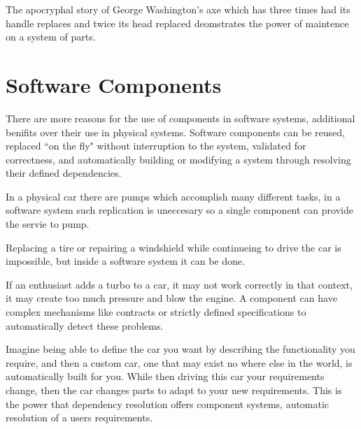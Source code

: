 \documentclass{report}
\begin{document}
The apocryphal story of George Washington's axe which has three times had its handle replaces and twice its head replaced deomstrates the power of maintence on a system of parts.


\section{Software Components}
{}There are more reasons for the use of components in software systems, additional benifits over their use in physical systems.
{}Software components can be reused, replaced ``on the fly" without interruption to the system, validated for correctness, 
{}and automatically building or modifying a system through resolving their defined dependencies.

In a physical car there are pumps which accomplish many different tasks, in a software system such replication is uneccesary so a single component can provide the servie to pump.

Replacing a tire or repairing a windshield while continueing to drive the car is impossible, but inside a software system it can be done.

If an enthusiast adds a turbo to a car, it may not work correctly in that context, it may create too much pressure and blow the engine.
A component can have complex mechanisms like contracts or strictly defined specifications to automatically detect these problems.

Imagine being able to define the car you want by describing the functionality you require, and then a custom car, one that may exist no where else in the world,
is automatically built for you. 
While then driving this car your requirements change, then the car changes parts to adapt to your new requirements.
This is the power that dependency resolution offers component systems, automatic resolution of a users requirements.
\end{document}
